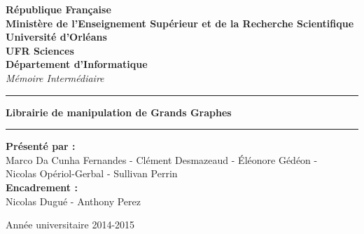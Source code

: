 \begin{titlepage}

\pagestyle{fancy}

\renewcommand{\footrulewidth}{1pt}


\fancyfoot[C]{\thepage}

\begin{center}

{\bf  République Fran\c caise
\\ Ministère de l'Enseignement Supérieur et de la
Recherche Scientifique} \vspace{1cm}\\
 {\bf {\large Université d'Orléans}}\\
{\bf UFR Sciences} \\ {\bf Département d'Informatique}\\

\vspace{3cm}
\Huge{\emph{{{\it {Mémoire Intermédiaire }}}}}\\
\vspace{2cm}

\noindent\rule{\textwidth}{0.7mm}
\Large{{\textbf{Librairie de manipulation de Grands Graphes }}}
\noindent\rule{\textwidth}{0.7mm}

\end{center}

\begin{center}

\vspace{2cm}
\textbf{Présenté par :}\\
{Marco Da Cunha Fernandes - Clément Desmazeaud - Éléonore Gédéon - } \\
{Nicolas Opériol-Gerbal  - Sullivan Perrin }\\																	
\vspace{1cm}
\textbf{Encadrement : }\\
{ Nicolas Dugué - Anthony Perez}\\

\end{center}

\vspace{3cm}

\begin{center}

Année universitaire 2014-2015

\end{center}

\end{titlepage}
